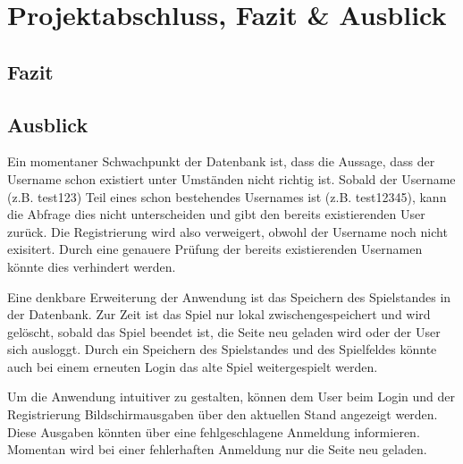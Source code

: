 
\chapter{Projektabschluss, Fazit \& Ausblick}\label{cha:Schlussbetrachtung}
\section{Fazit}\label{sec:Fazit}

\section{Ausblick}\label{sec:Ausblick}
Ein momentaner Schwachpunkt der Datenbank ist, dass die Aussage, dass der Username schon existiert unter Umständen nicht richtig ist. Sobald der Username (z.B. test123) Teil eines schon bestehendes Usernames ist (z.B. test12345), kann die Abfrage dies nicht unterscheiden und gibt den bereits existierenden User zurück. Die Registrierung wird also verweigert, obwohl der Username noch nicht exisitert. Durch eine genauere Prüfung der bereits existierenden Usernamen könnte dies verhindert werden.

Eine denkbare Erweiterung der Anwendung ist das Speichern des Spielstandes in der Datenbank. Zur Zeit ist das Spiel nur lokal zwischengespeichert und wird gelöscht, sobald das Spiel beendet ist, die Seite neu geladen wird oder der User sich ausloggt. Durch ein Speichern des Spielstandes und des Spielfeldes könnte auch bei einem erneuten Login das alte Spiel weitergespielt werden.

Um die Anwendung intuitiver zu gestalten, können dem User beim Login und der Registrierung Bildschirmausgaben über den aktuellen Stand angezeigt werden. Diese Ausgaben könnten über eine fehlgeschlagene Anmeldung informieren. Momentan wird bei einer fehlerhaften Anmeldung nur die Seite neu geladen. 